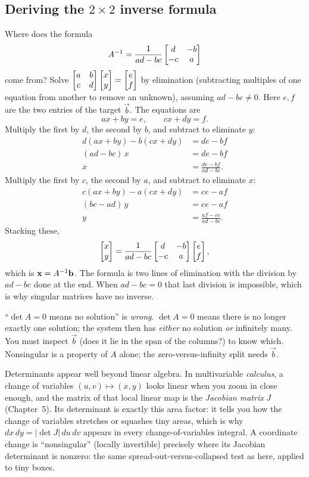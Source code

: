 \subsection{Deriving the $2\times 2$ inverse formula}

Where does the formula
\[
  A^{-1}=\frac{1}{ad-bc}\begin{bmatrix}d&-b\\-c&a\end{bmatrix}
\]
come from? Solve $\begin{bmatrix}a&b\\c&d\end{bmatrix}\begin{bmatrix}x\\y\end{bmatrix}=\begin{bmatrix}e\\f\end{bmatrix}$ by
elimination (subtracting multiples of one equation from another to remove an
unknown), assuming $ad-bc\neq0$. Here $e,f$ are the two entries of the
target $\vec b$. The equations are
\[
  ax+by=e,\qquad cx+dy=f.
\]
Multiply the first by $d$, the second by $b$, and subtract to eliminate $y$:
\[
\begin{aligned}
  d(ax+by) - b(cx+dy) &= de - bf\\
  (ad-bc)\,x &= de - bf\\
  x &= \frac{de-bf}{ad-bc}.
\end{aligned}
\]
Multiply the first by $c$, the second by $a$, and subtract to eliminate $x$:
\[
\begin{aligned}
  c(ax+by) - a(cx+dy) &= ce - af\\
  (bc-ad)\,y &= ce - af\\
  y &= \frac{af-ce}{ad-bc}.
\end{aligned}
\]
Stacking these,
\[
  \begin{bmatrix}x\\y\end{bmatrix}=\frac{1}{ad-bc}\begin{bmatrix}d & -b\\ -c & a\end{bmatrix}\begin{bmatrix}e\\f\end{bmatrix},
\]
which is $\mathbf{x}=A^{-1}\mathbf{b}$. The formula is two lines of elimination
with the division by $ad-bc$ done at the end. When $ad-bc=0$ that last
division is impossible, which is why singular matrices have no inverse.

\begin{trapbox}
``$\det A=0$ means no solution'' is \emph{wrong}. $\det A = 0$ means
there is no longer exactly one solution; the system then has \emph{either} no solution \emph{or} infinitely many. You
must inspect $\vec b$ (does it lie in the span of the columns?) to know
which. Nonsingular is a property of $A$ alone; the zero-versus-infinity split
needs $\vec b$.
\end{trapbox}

\begin{connectionbox}
Determinants appear well beyond linear algebra. In multivariable
\emph{calculus}, a change of variables $(u,v)\mapsto(x,y)$ looks linear
when you zoom in close enough, and the matrix of that local linear map is
the \emph{Jacobian matrix} $J$ (Chapter~5). Its determinant is exactly this
area factor: it tells you how the change of variables stretches or squashes
tiny areas, which is why
$dx\,dy = \lvert\det J\rvert\,du\,dv$ appears in every change-of-variables
integral. A coordinate change is ``nonsingular'' (locally invertible)
precisely where its Jacobian determinant is nonzero: the same
spread-out-versus-collapsed test as here, applied to tiny boxes.
\end{connectionbox}

